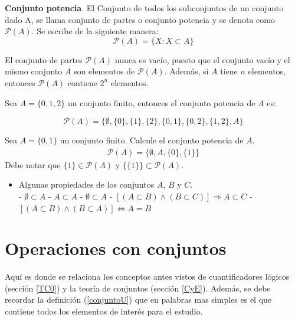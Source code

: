 \begin{mydef}
\textbf{Conjunto potencia}. El Conjunto de todos los subconjuntos de un conjunto dado A, se llama conjunto de partes o conjunto potencia y se denota como $\mathcal{P}(A)$. Se escribe de la siguiente manera:
\begin{equation*}
\mathcal{P}(A)=\{X: X\subset A\}
\end{equation*}
\end{mydef}

El conjunto de partes $\mathcal{P}(A)$ nunca es vacío, puesto que el conjunto vacío y el mismo conjunto $A$ son elementos de $\mathcal{P}(A)$. Además, si $A$ tiene $n$ elementos, entonces $\mathcal{P}(A)$ contiene $2^{n}$ elementos.

\begin{myexample}
Sea $A=\{0,1,2\}$ un conjunto finito, entonces el conjunto potencia de $A$ es:
\end{myexample}
\begin{equation*}
\mathcal{P}(A)=\{\emptyset,\{0\},\{1\},\{2\},\{0,1\},\{0,2\},\{1,2\},A\}
\end{equation*} 

\begin{myexample}
Sea $A=\{0,1\}$ un conjunto finito. Calcule el conjunto potencia de $A$.\\
\begin{eqnarray*}
\mathcal{P}(A)=\{\emptyset,A,\{0\},\{1\}\}
\end{eqnarray*}
Debe notar que $\{1\}\in \mathcal{P}(A)$ y $\{\{1\}\}\subset \mathcal{P}(A)$.
\end{myexample}
 

\begin{itemize}
\item Algunas propiedades de los conjuntos $A$, $B$ y $C$.\\
	\subitem - $\emptyset \subset A$
	\subitem - $A\subset A$
	\subitem - $\emptyset\subset A$
	\subitem - $[(A\subset B)\wedge(B\subset C)]\Rightarrow A\subset C$
	\subitem - $[(A\subset B)\wedge(B\subset A)]\Leftrightarrow A=B$
\end{itemize} 

\section{Operaciones con conjuntos}
\label{opc}
Aquí es donde se relaciona los conceptos antes vistos de cuantificadores lógicos (sección \ref{TC0}) y la teoría de conjuntos (sección \ref{CyE}). Además, se debe recordar la definición (\ref{conjuntoU}) que en palabras mas simples es el que contiene todos los elementos de interés para el estudio.\\


